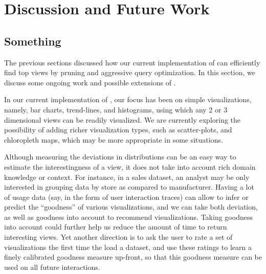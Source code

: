 

\section{Discussion and Future Work}
\label{sec:discussion}




\subsection{Something}
The previous sections discussed how our current implementation of \SeeDB can
efficiently find top views by pruning and aggressive query optimization.
In this section, we discuss some ongoing work and possible extensions of
\SeeDB.

 In our current implementation
of \SeeDB, our focus has been on simple visualizations, namely, bar charts, trend-lines,
and histograms, using which any 2 or 3 dimensional views can be readily visualized.
We are currently exploring the possibility of adding richer visualization types,
such as scatter-plots, and chloropleth maps, which may be more appropriate
in some situations. 

 Although measuring the 
deviations in distributions can be an easy way to estimate the interestingness of a 
view, it does not take into account rich domain knowledge or context.
For instance, in a sales dataset, an analyst may be only interested in grouping
data by store as compared to manufacturer. 
Having a lot of usage data (say, in the form of user interaction traces)
can allow \SeeDB to infer or predict the ``goodness''
of various visualizations, and we can take both deviation, as well as 
goodness into account to recommend visualizations. 
Taking goodness into account could further help us reduce the amount of time
to return interesting views.
Yet another direction is to ask the user to rate a set of visualizations
the first time the load a dataset, and use these ratings to 
learn a finely calibrated goodness measure up-front,
so that this goodness measure can be used on all future interactions.

 

